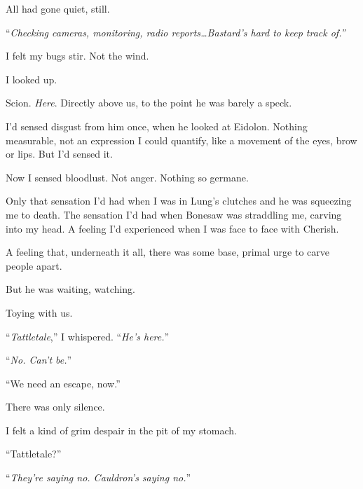 All had gone quiet, still.



``\emph{Checking cameras, monitoring, radio reports\ldots}\emph{Bastard's hard to keep track of.''}



I felt my bugs stir.  Not the wind.



I looked up.



Scion.  \emph{Here}.  Directly above us, to the point he was barely a speck.



I'd sensed disgust from him once, when he looked at Eidolon.  Nothing measurable, not an expression I could quantify, like a movement of the eyes, brow or lips.  But I'd sensed it.



Now I sensed bloodlust.  Not anger.  Nothing so germane.



Only that sensation I'd had when I was in Lung's clutches and he was squeezing me to death.  The sensation I'd had when Bonesaw was straddling me, carving into my head.  A feeling I'd experienced when I was face to face with Cherish.



A feeling that, underneath it all, there was some base, primal urge to carve people apart.



But he was waiting, watching.



Toying with us.



``\emph{Tattletale},'' I whispered.  ``\emph{He's here.}''



``\emph{No.  Can't be.}''



``We need an escape, now.''



There was only silence.



I felt a kind of grim despair in the pit of my stomach.



``Tattletale?''



``\emph{They're saying no.  Cauldron's saying no.}''



